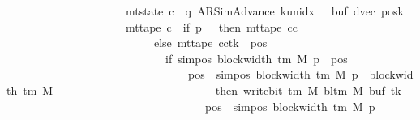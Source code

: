 \begin{isabellebody}
\ \ \ \ \ \ \ \ \ \ \ \ \ \ \ \ \ \ \ \ {\isasymand}\ mt{\isacharunderscore}{\kern0pt}state\ c{\isacharprime}{\kern0pt}{\isacharprime}{\kern0pt}\ {\isacharequal}{\kern0pt}\ {\isacharparenleft}{\kern0pt}q{\isacharcomma}{\kern0pt}\ AR{\isacharunderscore}{\kern0pt}SimAdvance{\isacharcomma}{\kern0pt}\ k{\isacharunderscore}{\kern0pt}unidx\ {}{\isacharcomma}{\kern0pt}\ {}{\isacharcomma}{\kern0pt}\ buf{\isacharcomma}{\kern0pt}\ dvec{\isacharcomma}{\kern0pt}\ posk{\isacharparenright}{\kern0pt}\isanewline
\ \ \ \ \ \ \ \ \ \ \ \ \ \ \ \ \ \ \ \ {\isasymand}\ mt{\isacharunderscore}{\kern0pt}tape\ c{\isacharprime}{\kern0pt}{\isacharprime}{\kern0pt}\ {\isacharequal}{\kern0pt}\ {\isacharparenleft}{\kern0pt}if\ p{\isacharprime}{\kern0pt}\ {\isacharequal}{\kern0pt}\ {}\ then\ mt{\isacharunderscore}{\kern0pt}tape\ cc\isanewline
\ \ \ \ \ \ \ \ \ \ \ \ \ \ \ \ \ \ \ \ \ \ \ \ \ \ else\ {\isacharparenleft}{\kern0pt}mt{\isacharunderscore}{\kern0pt}tape\ cc{\isacharparenright}{\kern0pt}{\isacharparenleft}{\kern0pt}tk{\isacharprime}{\kern0pt}\ {\isacharcolon}{\kern0pt}{\isacharequal}{\kern0pt}\ {\isacharparenleft}{\kern0pt}{\isasymlambda}pos{\isachardot}{\kern0pt}\isanewline
\ \ \ \ \ \ \ \ \ \ \ \ \ \ \ \ \ \ \ \ \ \ \ \ \ \ \ \ if\ sim{\isacharunderscore}{\kern0pt}pos\ {\isacharparenleft}{\kern0pt}block{\isacharunderscore}{\kern0pt}width\ {\isacharparenleft}{\kern0pt}{\isasymGamma}{\isacharunderscore}{\kern0pt}tm\ M{\isacharparenright}{\kern0pt}{\isacharparenright}{\kern0pt}\ p{\isacharprime}{\kern0pt}\ {\isasymle}\ pos\isanewline
\ \ \ \ \ \ \ \ \ \ \ \ \ \ \ \ \ \ \ \ \ \ \ \ \ \ \ \ \ \ \ {\isasymand}\ pos\ {\isacharless}{\kern0pt}\ sim{\isacharunderscore}{\kern0pt}pos\ {\isacharparenleft}{\kern0pt}block{\isacharunderscore}{\kern0pt}width\ {\isacharparenleft}{\kern0pt}{\isasymGamma}{\isacharunderscore}{\kern0pt}tm\ M{\isacharparenright}{\kern0pt}{\isacharparenright}{\kern0pt}\ p{\isacharprime}{\kern0pt}\ {\isacharplus}{\kern0pt}\ block{\isacharunderscore}{\kern0pt}width\ {\isacharparenleft}{\kern0pt}{\isasymGamma}{\isacharunderscore}{\kern0pt}tm\ M{\isacharparenright}{\kern0pt}\isanewline
\ \ \ \ \ \ \ \ \ \ \ \ \ \ \ \ \ \ \ \ \ \ \ \ \ \ \ \ then\ write{\isacharunderscore}{\kern0pt}bit\ {\isacharparenleft}{\kern0pt}{\isasymGamma}{\isacharunderscore}{\kern0pt}tm\ M{\isacharparenright}{\kern0pt}\ {\isacharparenleft}{\kern0pt}bl{\isacharunderscore}{\kern0pt}tm\ M{\isacharparenright}{\kern0pt}\ {\isacharparenleft}{\kern0pt}buf\ tk{\isacharprime}{\kern0pt}{\isacharparenright}{\kern0pt}\isanewline
\ \ \ \ \ \ \ \ \ \ \ \ \ \ \ \ \ \ \ \ \ \ \ \ \ \ \ \ \ \ \ \ \ \ \ {\isacharparenleft}{\kern0pt}pos\ {\isacharminus}{\kern0pt}\ sim{\isacharunderscore}{\kern0pt}pos\ {\isacharparenleft}{\kern0pt}block{\isacharunderscore}{\kern0pt}width\ {\isacharparenleft}{\kern0pt}{\isasymGamma}{\isacharunderscore}{\kern0pt}tm\ M{\isacharparenright}{\kern0pt}{\isacharparenright}{\kern0pt}\ p{\isacharprime}{\kern0pt}{\isacharparenright}{\kern0pt}\isanewline

\end{isabellebody}
